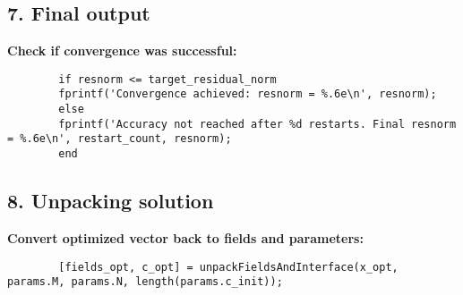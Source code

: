 \documentclass{article}
\begin{document}
	\subsection*{7. Final output}
	
	\textbf{Check if convergence was successful:}
	
	\begin{lstlisting}
		if resnorm <= target_residual_norm
		fprintf('Convergence achieved: resnorm = %.6e\n', resnorm);
		else
		fprintf('Accuracy not reached after %d restarts. Final resnorm = %.6e\n', restart_count, resnorm);
		end
	\end{lstlisting}
	
	\subsection*{8. Unpacking solution}
	
	\textbf{Convert optimized vector back to fields and parameters:}
	
	\begin{lstlisting}
		[fields_opt, c_opt] = unpackFieldsAndInterface(x_opt, params.M, params.N, length(params.c_init));
	\end{lstlisting}
	
\end{document}
